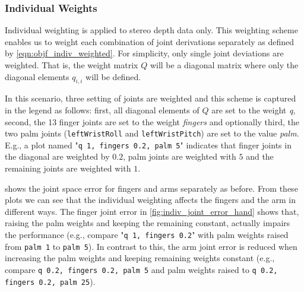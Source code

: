 \subsubsection{Individual Weights}

Individual weighting is applied to stereo depth data only. This weighting scheme enables us to weight each combination of joint derivations separately as defined by \cref{eqn:objf_indiv_weighted}. For simplicity, only single joint deviations are weighted. That is, the weight matrix $Q$ will be a diagonal matrix where only the diagonal elements $q_{i,i}$ will be defined.

In this scenario, three setting of joints are weighted and this scheme is captured in the legend as follows: first, all diagonal elements of $Q$ are set to the weight \emph{q}, second, the 13 finger joints are set to the weight \emph{fingers} and optionally third, the two palm joints (\texttt{leftWristRoll} and \texttt{leftWristPitch}) are set to the value \emph{palm}. E.g., a plot named "\texttt{q 1, fingers 0.2, palm 5}" indicates that finger joints in the diagonal are weighted by $0.2$, palm joints are weighted with $5$ and the remaining joints are weighted with $1$.

 shows the joint space error for fingers and arms separately as before. From these plots we can see that the individual weighting affects the fingers and the arm in different ways. The finger joint error in \cref{fig:indiv_joint_error_hand} shows that, raising the palm weights and keeping the remaining constant, actually impairs the performance (e.g., compare "\texttt{q 1, fingers 0.2}" with palm weights raised from \texttt{palm 1} to \texttt{palm 5}). In contrast to this, the arm joint error is reduced when increasing the palm weights and keeping remaining weights constant (e.g., compare \texttt{q 0.2, fingers 0.2, palm 5} and palm weights raised to \texttt{q 0.2, fingers 0.2, palm 25}).

